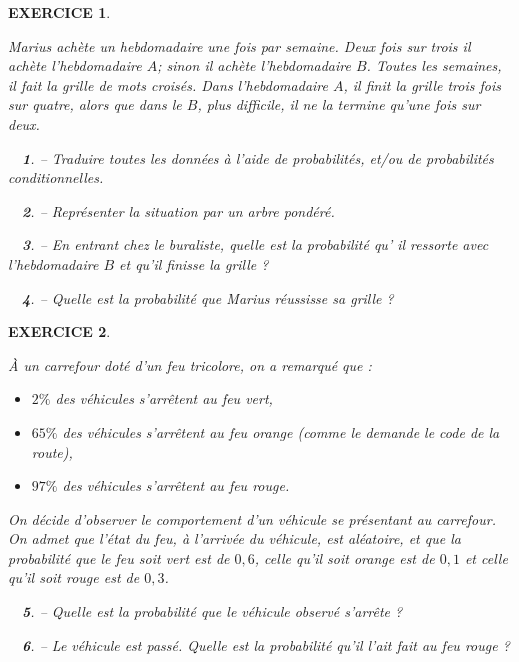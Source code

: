 \documentclass[a4paper]{article}   %
\renewcommand{\(}{\left(}
\renewcommand{\)}{\right)}
\newtheorem{ques}{~}
\newenvironment{qu}{\begin{ques}--} {\end{ques}}
\newtheorem{EXO}{\large EXERCICE }
\newenvironment{EX}   { \setcounter{ques}{0} \begin{EXO} \hrulefill ~\vspace{0.3cm}

\normalfont}    {\end{EXO} \medskip}
\begin{document}
\begin{center} 	
\end{center}

\begin{EX}
Marius achète un hebdomadaire une fois par semaine. Deux fois sur trois il achète l'hebdomadaire $A$; sinon il achète l'hebdomadaire $B$. Toutes les semaines, il fait la grille de mots croisés. Dans l'hebdomadaire $A$, il finit la grille trois fois sur quatre, alors que dans le $B$, plus difficile, il ne la termine qu'une fois sur deux. 

\begin{qu} Traduire toutes les données à l'aide de probabilités, et/ou de probabilités conditionnelles.
\end{qu}
\begin{qu} Représenter la situation par un arbre pondéré.
\end{qu}
\begin{qu} En entrant chez le buraliste, quelle est la probabilité qu' il ressorte avec l'hebdomadaire $B$ et qu'il finisse la grille ?
\end{qu}
\begin{qu} Quelle est la probabilité que Marius réussisse sa grille ?
\end{qu}
\end{EX}
\begin{EX}
\`A un carrefour doté d'un feu tricolore, on a remarqué que :
\begin{itemize}
\item $2\%$ des véhicules s'arrêtent au feu vert,
\item $65\%$ des véhicules s'arrêtent au feu orange (comme le demande le code de la route),
\item $97 \%$ des véhicules s'arrêtent au feu rouge.
\end{itemize}
On décide d'observer le comportement d'un véhicule se présentant au carrefour. On admet que l'état du feu, à l'arrivée du véhicule, est aléatoire, et que la probabilité que le feu soit vert est de $0,6$, celle qu'il soit orange est de $0,1$ et celle qu'il soit rouge est de $0,3$.
\begin{qu} Quelle est la probabilité que le véhicule observé s'arrête ?
\end{qu}
\begin{qu} Le véhicule est passé. Quelle est la probabilité qu'il l'ait fait au feu rouge ?
\end{qu}
\end{EX}
\end{document}
